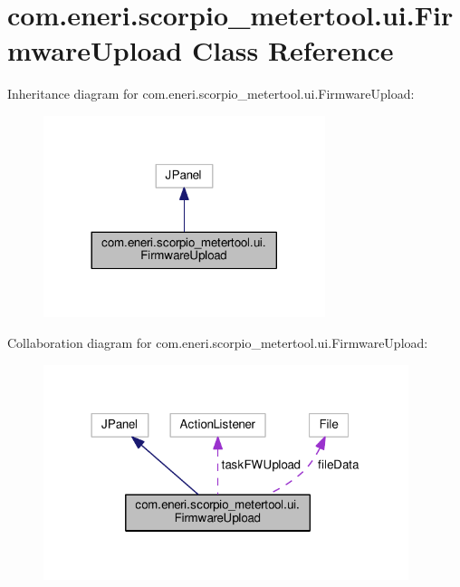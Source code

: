 \hypertarget{classcom_1_1eneri_1_1scorpio__metertool_1_1ui_1_1_firmware_upload}{}\section{com.\+eneri.\+scorpio\+\_\+metertool.\+ui.\+Firmware\+Upload Class Reference}
\label{classcom_1_1eneri_1_1scorpio__metertool_1_1ui_1_1_firmware_upload}


Inheritance diagram for com.\+eneri.\+scorpio\+\_\+metertool.\+ui.\+Firmware\+Upload\+:
\nopagebreak
\begin{figure}[H]
\begin{center}
\leavevmode
\includegraphics[width=233pt]{classcom_1_1eneri_1_1scorpio__metertool_1_1ui_1_1_firmware_upload__inherit__graph}
\end{center}
\end{figure}


Collaboration diagram for com.\+eneri.\+scorpio\+\_\+metertool.\+ui.\+Firmware\+Upload\+:
\nopagebreak
\begin{figure}[H]
\begin{center}
\leavevmode
\includegraphics[width=302pt]{classcom_1_1eneri_1_1scorpio__metertool_1_1ui_1_1_firmware_upload__coll__graph}
\end{center}
\end{figure}
